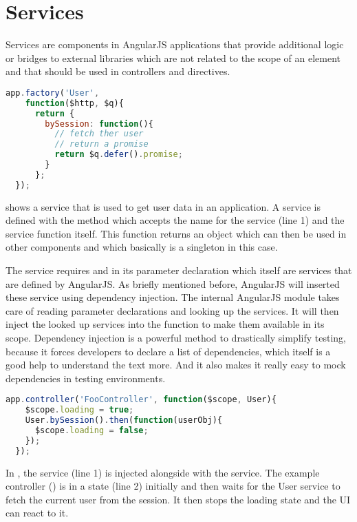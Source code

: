 \section{Services}
\label{sect:services}

Services are components in AngularJS applications that provide additional logic or bridges to external libraries which are not related to the scope of an element and that should be used in controllers and directives.

\begin{lstlisting}[language=JavaScript, caption=A simple AngularJS service, label=lst:angular-service]
  app.factory('User',
    function($http, $q){
      return {
        bySession: function(){
          // fetch ther user
          // return a promise
          return $q.defer().promise;
        }
      };
  });
\end{lstlisting}

 shows a  service that is used to get user data in an application. A service is defined with the  method which accepts the name for the service (line 1) and the service function itself. This function returns an object which can then be used in other components and which basically is a singleton in this case. 

The service requires  and  in its parameter declaration which itself are services that are defined by AngularJS. As briefly mentioned before, AngularJS will inserted these service using dependency injection. The internal AngularJS module  takes care of reading parameter declarations and looking up the services. It will then inject the looked up services into the function to make them available in its scope. Dependency injection is a powerful method to drastically simplify testing, because it forces developers to declare a list of dependencies, which itself is a good help to understand the text more. And it also makes it really easy to mock dependencies in testing environments.

\begin{lstlisting}[language=JavaScript, caption=A simple AngularJS service, label=lst:angular-service-example]
  app.controller('FooController', function($scope, User){
    $scope.loading = true;
    User.bySession().then(function(userObj){
      $scope.loading = false;
    });
  });
\end{lstlisting}

In , the  service (line 1) is injected alongside with the  service. The example controller () is in a  state (line 2) initially and then waits for the User service to fetch the current user from the session. It then stops the loading state and the UI can react to it.